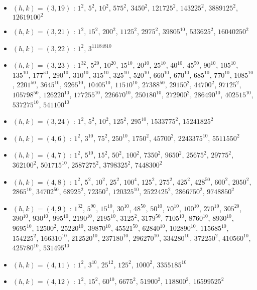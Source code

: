 \begin{itemize}
\item $(h,k)=(3,19)$ : $1^{2}$, $5^{2}$, $10^{2}$, $575^{2}$, $3450^{2}$, $121725^{2}$, $143225^{2}$, $3889125^{2}$, $12619100^{2}$
\item $(h,k)=(3,21)$ : $1^{2}$, $15^{2}$, $200^{2}$, $1125^{2}$, $2975^{2}$, $39805^{10}$, $533625^{2}$, $16040250^{2}$
\item $(h,k)=(3,22)$ : $1^{2}$, $3^{11184810}$
\item $(h,k)=(3,23)$ : $1^{32}$, $5^{20}$, $10^{20}$, $15^{10}$, $20^{10}$, $25^{10}$, $40^{10}$, $45^{50}$, $90^{10}$, $105^{10}$, $135^{10}$, $177^{50}$, $290^{10}$, $310^{10}$, $315^{10}$, $325^{10}$, $520^{10}$, $660^{10}$, $670^{10}$, $685^{10}$, $770^{10}$, $1085^{10}$, $2201^{50}$, $3645^{10}$, $9265^{10}$, $10405^{10}$, $11510^{10}$, $27388^{50}$, $29150^{2}$, $44700^{2}$, $97125^{2}$, $105798^{50}$, $126220^{10}$, $177255^{10}$, $226670^{10}$, $250180^{10}$, $272900^{2}$, $286490^{10}$, $402515^{10}$, $537275^{10}$, $541100^{10}$
\item $(h,k)=(3,24)$ : $1^{2}$, $5^{2}$, $10^{2}$, $125^{2}$, $295^{10}$, $1533775^{2}$, $15241825^{2}$
\item $(h,k)=(4,6)$ : $1^{2}$, $3^{10}$, $75^{2}$, $250^{10}$, $1750^{2}$, $45700^{2}$, $2243375^{10}$, $5511550^{2}$
\item $(h,k)=(4,7)$ : $1^{2}$, $5^{10}$, $15^{2}$, $50^{2}$, $100^{2}$, $7350^{2}$, $9650^{2}$, $25675^{2}$, $29775^{2}$, $362100^{2}$, $501715^{10}$, $2587275^{2}$, $3798325^{2}$, $7448300^{2}$
\item $(h,k)=(4,8)$ : $1^{2}$, $5^{2}$, $10^{2}$, $25^{2}$, $100^{4}$, $125^{2}$, $275^{2}$, $425^{2}$, $428^{50}$, $600^{2}$, $2050^{2}$, $2865^{10}$, $34702^{50}$, $68925^{2}$, $72350^{2}$, $120325^{10}$, $2522425^{2}$, $2866750^{2}$, $9748850^{2}$
\item $(h,k)=(4,9)$ : $1^{32}$, $5^{90}$, $15^{10}$, $30^{10}$, $48^{50}$, $50^{10}$, $70^{10}$, $100^{10}$, $270^{10}$, $305^{20}$, $390^{10}$, $930^{10}$, $995^{10}$, $2190^{10}$, $2195^{10}$, $3125^{2}$, $3179^{50}$, $7105^{10}$, $8760^{10}$, $8930^{10}$, $9695^{10}$, $12500^{2}$, $25220^{10}$, $39870^{10}$, $45521^{50}$, $62840^{10}$, $102890^{10}$, $115685^{10}$, $154225^{2}$, $166310^{10}$, $212520^{10}$, $237180^{10}$, $296270^{10}$, $334280^{10}$, $372250^{2}$, $410560^{10}$, $425780^{10}$, $531495^{10}$
\item $(h,k)=(4,11)$ : $1^{2}$, $3^{10}$, $25^{12}$, $125^{2}$, $1000^{2}$, $3355185^{10}$
\item $(h,k)=(4,12)$ : $1^{2}$, $15^{2}$, $60^{10}$, $6675^{2}$, $51900^{2}$, $118800^{2}$, $16599525^{2}$

\end{itemize}
